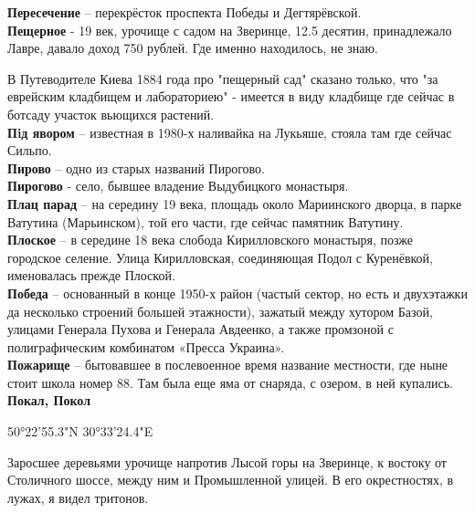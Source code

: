 \textbf{Пересечение} – перекрёсток проспекта Победы и Дегтярёвской.\\



\textbf{Пещерное} - 19 век, урочище с садом на Зверинце, 12.5 десятин, принадлежало Лавре, давало доход 750 рублей. Где именно находилось, не знаю.

В Путеводителе Киева 1884 года про "пещерный сад" сказано только, что "за еврейским кладбищем и лабораториею" - имеется в виду кладбище где сейчас в ботсаду участок вьющихся растений.\\



\textbf{Пiд явором} – известная в 1980-х наливайка на Лукьяше, стояла там где сейчас Сильпо.\\

\textbf{Пирово} – одно из старых названий Пирогово.\\

\textbf{Пирогово} - село, бывшее владение Выдубицкого монастыря.\\

\textbf{Плац парад} – на середину 19 века, площадь около Мариинского дворца, в парке Ватутина (Марьинском), той его части, где сейчас памятник Ватутину.\\

\textbf{Плоское} – в середине 18 века слобода Кирилловского монастыря, позже городское селение. Улица Кирилловская, соединяющая Подол с Куренёвкой, именовалась прежде Плоской.\\

\textbf{Победа} – основанный в конце 1950-х район (частый сектор, но есть и двухэтажки да несколько строений большей этажности), зажатый между хутором Базой, улицами Генерала Пухова и Генерала Авдеенко, а также промзоной с полиграфическим комбинатом «Пресса Украина».\\ 

\textbf{Пожарище} – бытовавшее в послевоенное время название местности, где ныне стоит школа номер 88. Там была еще яма от снаряда, с озером, в ней купались.\\

\textbf{Покал, Покол} 

50°22'55.3"N 30°33'24.4"E

Заросшее деревьями урочище напротив Лысой горы на Зверинце, к востоку от Столичного шоссе, между ним и Промышленной улицей. В его окрестностях, в лужах, я видел тритонов.

